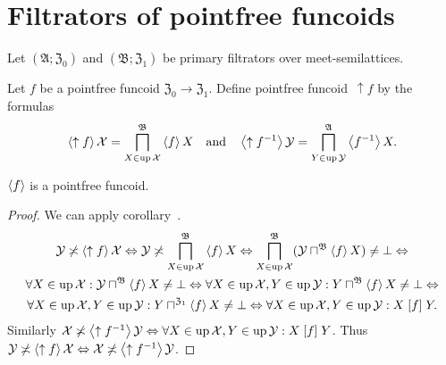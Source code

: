 \chapter{Filtrators of pointfree funcoids}

Let $(\mathfrak{A};\mathfrak{Z}_0)$ and $(\mathfrak{B};\mathfrak{Z}_1)$ be primary filtrators over meet-semilattices.

Let $f$ be a pointfree funcoid $\mathfrak{Z}_0\rightarrow\mathfrak{Z}_1$. Define pointfree funcoid~$\uparrow f$
by the formulas
\[
\left\langle \uparrow f\right\rangle \mathcal{X} = \bigsqcap^{\mathfrak{B}}_{X\in\operatorname{up}\mathcal{X}} \left\langle f\right\rangle X \quad\text{and}\quad
\left\langle \uparrow f^{-1}\right\rangle \mathcal{Y} = \bigsqcap^{\mathfrak{A}}_{Y\in\operatorname{up}\mathcal{Y}} \left\langle f^{-1}\right\rangle X.
\]

\begin{prop}
$\left\langle f\right\rangle$ is a pointfree funcoid.
\end{prop}

\begin{proof}
We can apply corollary~.
\begin{multline*}
\mathcal{Y} \not\asymp \left\langle \uparrow f\right\rangle \mathcal{X} \Leftrightarrow
\mathcal{Y} \not\asymp \bigsqcap^{\mathfrak{B}}_{X\in\operatorname{up}\mathcal{X}} \left\langle f\right\rangle X \Leftrightarrow
\bigsqcap^{\mathfrak{B}}_{X\in\operatorname{up}\mathcal{X}} (\mathcal{Y} \sqcap^{\mathfrak{B}} \left\langle f\right\rangle X) \ne \bot \Leftrightarrow \\
\forall X\in\operatorname{up}\mathcal{X}: \mathcal{Y} \sqcap^{\mathfrak{B}} \left\langle f\right\rangle X \ne \bot \Leftrightarrow
\forall X\in\operatorname{up}\mathcal{X}, Y\in\operatorname{up}\mathcal{Y}: Y \sqcap^{\mathfrak{B}} \left\langle f\right\rangle X \ne \bot \Leftrightarrow \\
\forall X\in\operatorname{up}\mathcal{X}, Y\in\operatorname{up}\mathcal{Y}: Y \sqcap^{\mathfrak{Z}_1} \left\langle f\right\rangle X \ne \bot \Leftrightarrow
\forall X\in\operatorname{up}\mathcal{X}, Y\in\operatorname{up}\mathcal{Y}: X\mathrel{\left[f\right]}Y.
\end{multline*}
Similarly $\mathcal{X} \not\asymp \left\langle \uparrow f^{-1}\right\rangle \mathcal{Y} \Leftrightarrow
\forall X\in\operatorname{up}\mathcal{X}, Y\in\operatorname{up}\mathcal{Y}: X\mathrel{\left[f\right]}Y$.
Thus $\mathcal{Y} \not\asymp \left\langle \uparrow f\right\rangle \mathcal{X} \Leftrightarrow \mathcal{X} \not\asymp \left\langle \uparrow f^{-1}\right\rangle \mathcal{Y}$.
\end{proof}
